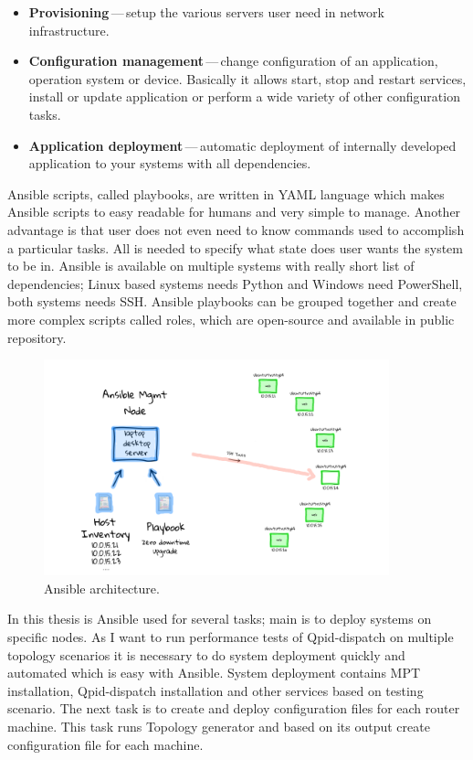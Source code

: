 \begin{itemize}
	\item \textbf{Provisioning}\,---\,setup the various servers user need in network infrastructure.
	\item \textbf{Configuration management}\,---\,change configuration of an application, operation system or device. Basically it allows start, stop and restart services, install or update application or perform a wide variety of other configuration tasks.
	\item \textbf{Application deployment}\,---\,automatic deployment of internally developed application to your systems with all dependencies.
\end{itemize}

Ansible scripts, called playbooks, are written in YAML language which makes Ansible scripts to easy readable for humans and very simple to manage. Another advantage is that user does not even need to know commands used to accomplish a particular tasks. All is needed to specify what state does user wants the system to be in. Ansible is available on multiple systems with really short list of dependencies; Linux based systems needs Python and Windows need PowerShell, both systems needs SSH. Ansible playbooks can be grouped together and create more complex scripts called roles, which are open-source and available in public repository.

\begin{figure}[H]
  \centering
  \includegraphics[width=10cm]{obrazky-figures/ansible.png}
  \caption{Ansible architecture. }
  \label{fig:ansible_architecture}
\end{figure}

In this thesis is Ansible used for several tasks; main is to deploy systems on specific nodes. As I want to run performance tests of Qpid-dispatch on multiple topology scenarios it is necessary to do system deployment quickly and automated which is easy with Ansible. System deployment contains MPT installation, Qpid-dispatch installation and other services based on testing scenario. The next task is to create and deploy configuration files for each router machine. This task runs Topology generator and based on its output create configuration file for each machine.


